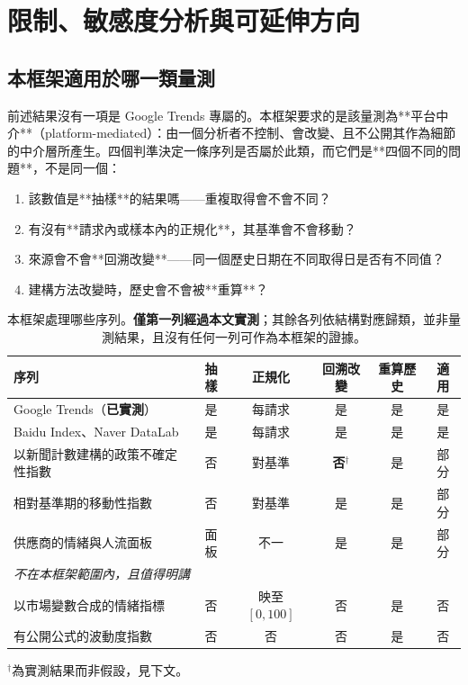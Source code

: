 \documentclass[12pt,a4paper,oneside]{article}
\begin{document}
\section{限制、敏感度分析與可延伸方向}

\subsection{本框架適用於哪一類量測}\label{sec:appliesto-zh}

前述結果沒有一項是 Google Trends 專屬的。本框架要求的是該量測為**平台中介**（platform-mediated）：由一個分析者不控制、會改變、且不公開其作為細節的中介層所產生。四個判準決定一條序列是否屬於此類，而它們是**四個不同的問題**，不是同一個：

\begin{enumerate}
\item 該數值是**抽樣**的結果嗎——重複取得會不會不同？
\item 有沒有**請求內或樣本內的正規化**，其基準會不會移動？
\item 來源會不會**回溯改變**——同一個歷史日期在不同取得日是否有不同值？
\item 建構方法改變時，歷史會不會被**重算**？
\end{enumerate}

\begin{table}[H]
\centering
\small
\caption{本框架處理哪些序列。\textbf{僅第一列經過本文實測}；其餘各列依結構對應歸類，並非量測結果，且沒有任何一列可作為本框架的證據。}
\label{tab:appliesto-zh}
\begin{tabularx}{\textwidth}{Xcccc c}
\toprule
序列 & 抽樣 & 正規化 & 回溯改變 & 重算歷史 & 適用\\
\midrule
Google Trends（\textbf{已實測}） & 是 & 每請求 & 是 & 是 & 是\\
Baidu Index、Naver DataLab & 是 & 每請求 & 是 & 是 & 是\\
以新聞計數建構的政策不確定性指數 & 否 & 對基準 & \textbf{否}$^\dagger$ & 是 & 部分\\
相對基準期的移動性指數 & 否 & 對基準 & 是 & 是 & 部分\\
供應商的情緒與人流面板 & 面板 & 不一 & 是 & 是 & 部分\\
\midrule
\multicolumn{6}{l}{\emph{不在本框架範圍內，且值得明講}}\\
以市場變數合成的情緒指標 & 否 & 映至 $[0,100]$ & 否 & 是 & 否\\
有公開公式的波動度指數 & 否 & 否 & 否 & 是 & 否\\
\bottomrule
\end{tabularx}
\raggedright\footnotesize
$^\dagger$為實測結果而非假設，見下文。
\end{table}
\end{document}
